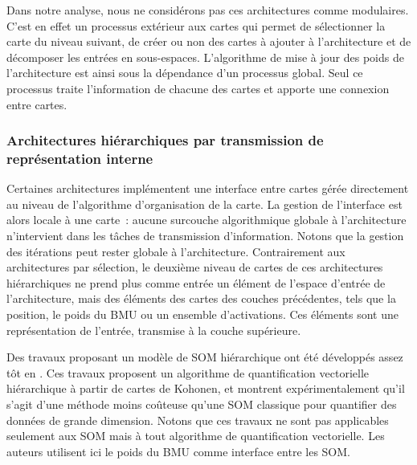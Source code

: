 \documentclass[../main]{subfiles}
\begin{document}
Dans notre analyse, nous ne considérons pas ces architectures comme modulaires.
C'est en effet un processus extérieur aux cartes qui permet de sélectionner la carte du niveau suivant, de créer ou non des cartes à ajouter à l'architecture et de décomposer les entrées en sous-espaces. 
L'algorithme de mise à jour des poids de l'architecture est ainsi sous la dépendance d'un processus global.
Seul ce processus traite l'information de chacune des cartes et apporte une connexion entre cartes.

\subsubsection{Architectures hiérarchiques par transmission de représentation interne}

Certaines architectures implémentent une interface entre cartes gérée directement au niveau de l'algorithme d'organisation de la carte. La gestion de l'interface est alors locale à une carte~: aucune surcouche algorithmique globale à l'architecture n'intervient dans les tâches de transmission d'information. Notons que la gestion des itérations peut rester globale à l'architecture.
Contrairement aux architectures par sélection, le deuxième niveau de cartes de ces architectures hiérarchiques ne prend plus comme entrée un élément de l'espace d'entrée de l'architecture, mais des éléments des cartes des couches précédentes, tels que la position, le poids du BMU ou un ensemble d'activations.
Ces éléments sont une représentation de l'entrée, transmise à la couche supérieure.

Des travaux proposant un modèle de SOM hiérarchique ont été développés assez tôt en \cite{luttrell_hierarchical_1989}. 
Ces travaux proposent un algorithme de quantification vectorielle hiérarchique à partir de cartes de Kohonen, et montrent expérimentalement qu'il s'agit d'une méthode moins coûteuse qu'une SOM classique pour quantifier des données de grande dimension. Notons que ces travaux ne sont pas applicables seulement aux SOM mais à tout algorithme de quantification vectorielle. Les auteurs utilisent ici le poids du BMU comme interface entre les SOM.
\end{document}
